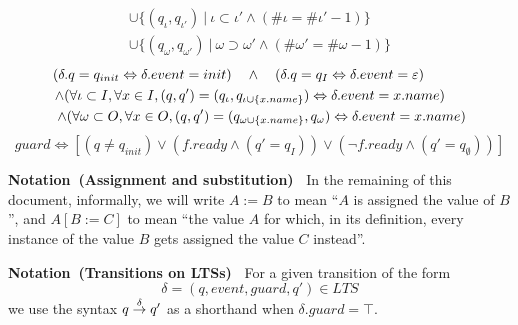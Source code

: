 \documentclass[runningheads]{llncs}
\newcommand{\Notation}[1]{\noindent\textbf{Notation~(#1)~}}
\newcommand{\aoverb}[2]{\stackrel{\mathclap{\footnotesize #1}}{#2}}
\newcommand{\s}{\hspace{1em}}
\newcommand{\halfs}{\hspace{0.5em}}
\begin{document}
\begin{definition}
\begin{multline}
        \cup \{(q_{\iota},q_{\iota'})~|~\iota\subset\iota' \wedge (\#\iota = \#\iota'-1)\}\\
        \cup \{(q_{\omega},q_{\omega'})~|~\omega\supset\omega' \wedge (\#\omega' = \#\omega-1)\}
    \end{multline}
    \begin{equation}
        \begin{split}
        (\delta.q = q_{init} \Leftrightarrow \delta.event = init)\s\wedge\s(\delta.q = q_{I} \Leftrightarrow \delta.event = \varepsilon)\s\s\s\\
        \wedge (\forall \iota \subset I, \forall x \in I, (q, q') = (q_{\iota},q_{\iota\cup\{x.name\}}) \Leftrightarrow \delta.event = x.name)\s\halfs\\
        \wedge (\forall \omega \subset O, \forall x \in O, (q, q') = (q_{\omega\cup\{x.name\}},q_{\omega}) \Leftrightarrow \delta.event = x.name)
        \end{split}
    \end{equation}
    \begin{equation}
        guard \Leftrightarrow [(q \neq q_{init}) \vee (f.ready \wedge (q' = q_I)) \vee (\neg f.ready \wedge (q' = q_\emptyset))]
    \end{equation}
\end{definition}

\Notation{Assignment and substitution} In the remaining of this document, informally, we will write $A := B$ to mean ``$A$ is assigned the value of $B$'', and $A[B := C]$ to mean ``the value $A$ for which, in its definition, every instance of the value $B$ gets assigned the value $C$ instead''.

\Notation{Transitions on LTSs} For a given transition of the form 
\begin{equation*}
    \delta = (q, event, guard, q') \in LTS
\end{equation*}
we use the syntax $q\aoverb{\delta}{\rightarrow}q'$ as a shorthand when $\delta.guard = \top$.
\end{document}
